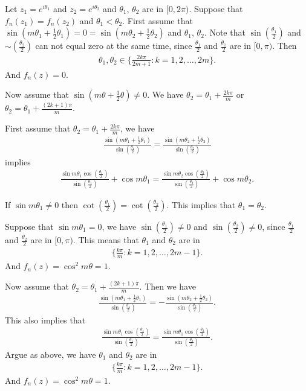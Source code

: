 \documentclass[a4paper,10pt]{amsart}
\begin{document}
Let $z_1 = e^{i\theta_1}$ and $z_2 = e^{i\theta_2}$ and
$\theta_1$, $\theta_2$ are in $[0, 2\pi)$. Suppose that 
$f_{n}(z_1) = f_{n}(z_2)$ and $\theta_1 < \theta_2$. 
First assume that $\sin (m\theta_1 + \frac{1}{2}\theta_1) = 0
= \sin (m\theta_2 + \frac{1}{2}\theta_2)$ and $\theta_1$, $\theta_2$.
Note that $\sin (\frac{\theta_1}{2})$ and $\sim (\frac{\theta_2}{2})$ can
not equal zero at the same time, since $\frac{\theta_1}{2}$ and 
$\frac{\theta_1}{2}$ are in $[0, \pi)$. Then
\begin{align*}
    \theta_1, \theta_2 \in \{\frac{2k\pi}{2m+1} : k = 1, 2, \ldots, 2m\}. 
\end{align*}
And $f_n(z) = 0$.

Now assume that $\sin (m\theta + \frac{1}{2}\theta) \neq 0$.
We have $\theta_2 = \theta_1 + \frac{2k\pi}{m}$ or
$\theta_2 = \theta_1 + \frac{(2k+1)\pi}{m}$.

First assume that $\theta_2 = \theta_1 + \frac{2k\pi}{m}$, we have
\begin{align*}
    \frac{\sin (m\theta_1 + \frac{1}{2}\theta_1)}
       {\sin (\frac{\theta_1}{2})} =
    \frac{\sin (m\theta_2 + \frac{1}{2}\theta_2)}
       {\sin (\frac{\theta_2}{2})}
\end{align*}
implies
\begin{align*}
    \frac{\sin m\theta_1 \cos (\frac{\theta_1}{2})}
    {\sin (\frac{\theta_1}{2})} + \cos m\theta_1  
    =
    \frac{\sin m\theta_2 \cos (\frac{\theta_2}{2})}
    {\sin (\frac{\theta_2}{2})} + \cos m\theta_2 . 
\end{align*}

If $\sin m\theta_1 \neq 0$ then $\cot (\frac{\theta_1}{2}) = 
\cot (\frac{\theta_2}{2})$. This implies that $\theta_1 = \theta_2$. 

Suppose that $\sin m\theta_1 = 0$, we have 
$\sin (\frac{\theta_1}{2}) \neq 0$ and $\sin (\frac{\theta_2}{2}) \neq 0$,
since $\frac{\theta_1}{2}$ and $\frac{\theta_2}{2}$ are in $[0, \pi)$.
This means that $\theta_1$ and $\theta_2$ are in 
\begin{align*}
    \{\frac{k\pi}{m} : k = 1, 2, \ldots, 2m-1 \}.
\end{align*}
And $f_n(z) = \cos^{2} m\theta = 1$.

Now assume that $\theta_2 = \theta_1 + \frac{(2k+1)\pi}{m}$. Then we have
\begin{align*}
    \frac{\sin (m\theta_1 + \frac{1}{2}\theta_1)}
       {\sin (\frac{\theta_1}{2})} =
    -\frac{\sin (m\theta_2 + \frac{1}{2}\theta_2)}
       {\sin (\frac{\theta_2}{2})}.
\end{align*}
This also implies that
\begin{align*}
    \frac{\sin m\theta_1 \cos (\frac{\theta_1}{2})}
    {\sin (\frac{\theta_1}{2})} 
    =
    \frac{\sin m\theta_1 \cos (\frac{\theta_2}{2})}
    {\sin (\frac{\theta_2}{2})}. 
\end{align*}
Argue as above, we have $\theta_1$ and $\theta_2$ are in 
\begin{align*}
    \{\frac{k\pi}{m} : k = 1, 2, \ldots, 2m-1 \}.
\end{align*}
And $f_n(z) = \cos^{2} m\theta = 1$.   
\end{document}
